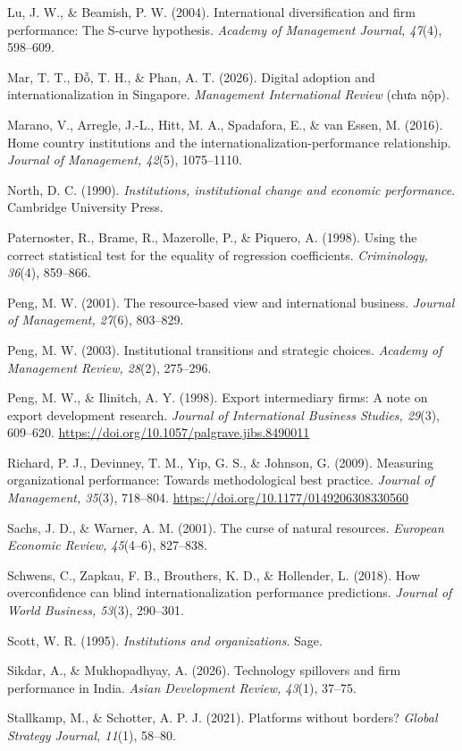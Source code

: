 \documentclass[
  a4paper,
  13pt]{extreport}
\begin{document}
Lu, J. W., \& Beamish, P. W. (2004). International diversification and
firm performance: The S-curve hypothesis. \emph{Academy of Management
Journal, 47}(4), 598--609.

Mar, T. T., Đỗ, T. H., \& Phan, A. T. (2026). Digital adoption and
internationalization in Singapore. \emph{Management International
Review} (chưa nộp).

Marano, V., Arregle, J.-L., Hitt, M. A., Spadafora, E., \& van Essen, M.
(2016). Home country institutions and the
internationalization-performance relationship. \emph{Journal of
Management, 42}(5), 1075--1110.

North, D. C. (1990). \emph{Institutions, institutional change and
economic performance}. Cambridge University Press.

Paternoster, R., Brame, R., Mazerolle, P., \& Piquero, A. (1998). Using
the correct statistical test for the equality of regression
coefficients. \emph{Criminology, 36}(4), 859--866.

Peng, M. W. (2001). The resource-based view and international business.
\emph{Journal of Management, 27}(6), 803--829.

Peng, M. W. (2003). Institutional transitions and strategic choices.
\emph{Academy of Management Review, 28}(2), 275--296.

Peng, M. W., \& Ilinitch, A. Y. (1998). Export intermediary firms: A
note on export development research. \emph{Journal of International
Business Studies, 29}(3), 609--620.
\url{https://doi.org/10.1057/palgrave.jibs.8490011}

Richard, P. J., Devinney, T. M., Yip, G. S., \& Johnson, G. (2009).
Measuring organizational performance: Towards methodological best
practice. \emph{Journal of Management, 35}(3), 718--804.
\url{https://doi.org/10.1177/0149206308330560}

Sachs, J. D., \& Warner, A. M. (2001). The curse of natural resources.
\emph{European Economic Review, 45}(4--6), 827--838.

Schwens, C., Zapkau, F. B., Brouthers, K. D., \& Hollender, L. (2018).
How overconfidence can blind internationalization performance
predictions. \emph{Journal of World Business, 53}(3), 290--301.

Scott, W. R. (1995). \emph{Institutions and organizations}. Sage.

Sikdar, A., \& Mukhopadhyay, A. (2026). Technology spillovers and firm
performance in India. \emph{Asian Development Review, 43}(1), 37--75.

Stallkamp, M., \& Schotter, A. P. J. (2021). Platforms without borders?
\emph{Global Strategy Journal, 11}(1), 58--80.
\end{document}
